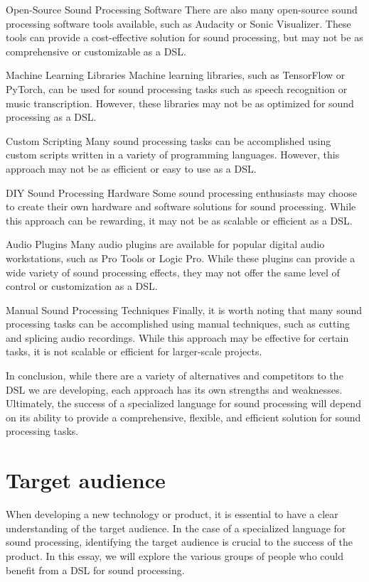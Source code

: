 Open-Source Sound Processing Software
There are also many open-source sound processing software tools available, such as Audacity or Sonic Visualizer. These tools can provide a cost-effective solution for sound processing, but may not be as comprehensive or customizable as a DSL.

Machine Learning Libraries
Machine learning libraries, such as TensorFlow or PyTorch, can be used for sound processing tasks such as speech recognition or music transcription. However, these libraries may not be as optimized for sound processing as a DSL.

Custom Scripting
Many sound processing tasks can be accomplished using custom scripts written in a variety of programming languages. However, this approach may not be as efficient or easy to use as a DSL.

DIY Sound Processing Hardware
Some sound processing enthusiasts may choose to create their own hardware and software solutions for sound processing. While this approach can be rewarding, it may not be as scalable or efficient as a DSL.

Audio Plugins
Many audio plugins are available for popular digital audio workstations, such as Pro Tools or Logic Pro. While these plugins can provide a wide variety of sound processing effects, they may not offer the same level of control or customization as a DSL.

Manual Sound Processing Techniques
Finally, it is worth noting that many sound processing tasks can be accomplished using manual techniques, such as cutting and splicing audio recordings. While this approach may be effective for certain tasks, it is not scalable or efficient for larger-scale projects.

In conclusion, while there are a variety of alternatives and competitors to the DSL we are developing, each approach has its own strengths and weaknesses. Ultimately, the success of a specialized language for sound processing will depend on its ability to provide a comprehensive, flexible, and efficient solution for sound processing tasks.
\section{Target audience} 
When developing a new technology or product, it is essential to have a clear understanding of the target audience. In the case of a specialized language for sound processing, identifying the target audience is crucial to the success of the product. In this essay, we will explore the various groups of people who could benefit from a DSL for sound processing.

